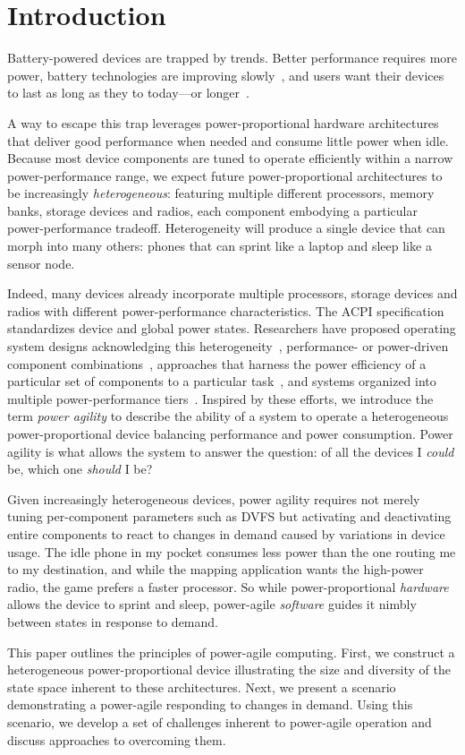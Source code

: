 \section{Introduction}

Battery-powered devices are trapped by trends. Better performance requires more
power, battery technologies are improving
slowly~\cite{economist-batteryhistory}, and users want their devices to last as
long as they to today---or longer~\cite{informationweek-batteries}.

A way to escape this trap leverages power-proportional hardware
architectures~\cite{barroso-energyproportional} that deliver good performance
when needed and consume little power when idle. Because most device
components are tuned to operate efficiently within a narrow power-performance
range, we expect future power-proportional architectures to be increasingly
\textit{heterogeneous}: featuring multiple different processors, memory
banks, storage devices and radios, each component embodying a particular
power-performance tradeoff. Heterogeneity will produce a single device that
can morph into many others: phones that can sprint like a laptop and sleep
like a sensor node.

Indeed, many devices already incorporate multiple processors, storage devices
and radios with different power-performance characteristics. The ACPI
specification~\cite{acpi-standard} standardizes device and global power
states. Researchers have proposed operating system designs acknowledging this
heterogeneity~\cite{baumann-barrelfish}, performance- or power-driven
component combinations~\cite{mogul-hybridnvmdram,aruna-3Gwifi}, approaches
that harness the power efficiency of a particular set of components to a
particular task~\cite{andersen-fawn,szalay-amdahl}, and systems organized
into multiple power-performance tiers~\cite{sorber-turducken}. Inspired by
these efforts, we introduce the term \textit{power agility} to describe the
ability of a system to operate a heterogeneous power-proportional device
balancing performance and power consumption. Power agility is what allows the
system to answer the question: of all the devices I \textit{could} be, which
one \textit{should} I be?

Given increasingly heterogeneous devices, power agility requires not merely
tuning per-component parameters such as DVFS but activating and deactivating
entire components to react to changes in demand caused by variations in device
usage. The idle phone in my pocket consumes less power than the one routing me
to my destination, and while the mapping application wants the high-power
radio, the game prefers a faster processor. So while power-proportional
\textit{hardware} allows the device to sprint and sleep, power-agile
\textit{software} guides it nimbly between states in response to demand.

This paper outlines the principles of power-agile computing. First, we
construct a heterogeneous power-proportional device illustrating the size and
diversity of the state space inherent to these architectures. Next, we
present a scenario demonstrating a power-agile responding to changes in
demand. Using this scenario, we develop a set of challenges inherent to
power-agile operation and discuss approaches to overcoming them.

